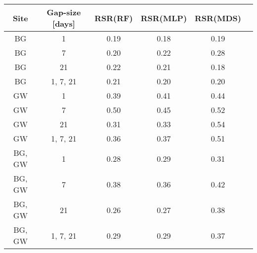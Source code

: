 \begin{tabular}{|c|c|c|c|c|c|}
\toprule
Site & Gap-size [days] & RSR(RF) & RSR(MLP) & RSR(MDS) \\
\midrule
BG & 1 & 0.19 & 0.18 & 0.19 \\
BG & 7 & 0.20 & 0.22 & 0.28 \\
BG & 21 & 0.22 & 0.21 & 0.18 \\
BG & 1, 7, 21 & 0.21 & 0.20 & 0.20 \\
GW & 1 & 0.39 & 0.41 & 0.44 \\
GW & 7 & 0.50 & 0.45 & 0.52 \\
GW & 21 & 0.31 & 0.33 & 0.54 \\
GW & 1, 7, 21 & 0.36 & 0.37 & 0.51 \\
BG, GW & 1 & 0.28 & 0.29 & 0.31 \\
BG, GW & 7 & 0.38 & 0.36 & 0.42 \\
BG, GW & 21 & 0.26 & 0.27 & 0.38 \\
BG, GW & 1, 7, 21 & 0.29 & 0.29 & 0.37 \\
\bottomrule
\end{tabular}

